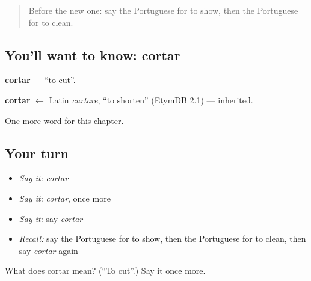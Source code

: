 \begin{quote}
Before the new one: say the Portuguese for to show, then the Portuguese for to clean.
\end{quote}

\subsection*{You'll want to know: cortar}
\textbf{cortar} — \textquotedblleft{}to cut\textquotedblright{}.

\begin{cousinweb}
\textbf{cortar} $\leftarrow$ Latin \emph{curtare}, \textquotedblleft{}to shorten\textquotedblright{} (EtymDB 2.1) — inherited.
\end{cousinweb}

\begin{grammarlens}[title={What you've built}]
One more word for this chapter.
\end{grammarlens}

\subsection*{Your turn}
\begin{itemize}
\raggedright
  \item \emph{Say it:} \emph{cortar}
  \item \emph{Say it:} \emph{cortar}, once more
  \item \emph{Say it:} say \emph{cortar}
  \item \emph{Recall:} say the Portuguese for to show, then the Portuguese for to clean, then say \emph{cortar} again
\end{itemize}

\begin{tcolorbox}[breakable,colback=teal!4,colframe=teal!35!black,title={Before you move on}]
What does cortar mean? (\textquotedblleft{}To cut\textquotedblright{}.) Say it once more.
\end{tcolorbox}
